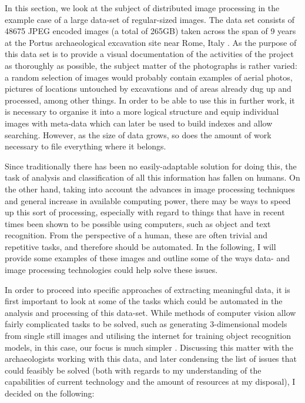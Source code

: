\documentclass [12pt,a4paper]{report}
\begin{document}
In this section, we look at the subject of distributed image processing in the example case of a large data-set of regular-sized images. The data set consists of 48675 JPEG encoded images (a total of 265GB) taken across the span of 9 years at the Portus archaeological excavation site near Rome, Italy \cite{portusproject}. As the purpose of this data set is to provide a visual documentation of the activities of the project as thoroughly as possible, the subject matter of the photographs is rather varied: a random selection of images would probably contain examples of aerial photos, pictures of locations untouched by excavations and of areas already dug up and processed, among other things. In order to be able to use this in further work, it is necessary to organise it into a more logical structure and equip individual images with meta-data which can later be used to build indexes and allow searching. However, as the size of data grows, so does the amount of work necessary to file everything where it belongs.

Since traditionally there has been no easily-adaptable solution for doing this, the task of analysis and classification of all this information has fallen on humans. On the other hand, taking into account the advances in image processing techniques and general increase in available computing power, there may be ways to speed up this sort of processing, especially with regard to things that have in recent times been shown to be possible using computers, such as object and text recognition. From the perspective of a human, these are often trivial and repetitive tasks, and therefore should be automated. In the following, I will provide some examples of these images and outline some of the ways data- and image processing technologies could help solve these issues.

In order to proceed into specific approaches of extracting meaningful data, it is first important to look at some of the tasks which could be automated in the analysis and processing of this data-set. While methods of computer vision allow fairly complicated tasks to be solved, such as generating 3-dimensional models from single still images and utilising the internet for training object recognition models, in this case, our focus is much simpler \cite{sudo2009associative,saxena2008}. Discussing this matter with the archaeologists working with this data, and later condensing the list of issues that could feasibly be solved (both with regards to my understanding of the capabilities of current technology and the amount of resources at my disposal), I decided on the following:
\end{document}

